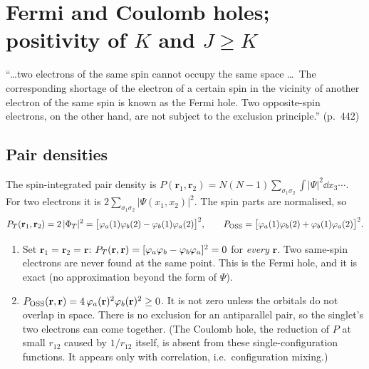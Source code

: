 \section{Fermi and Coulomb holes; positivity of $K$ and $J\ge K$}\label{sec:holes}

\begin{reviewclaim}
``\dots two electrons of the same spin cannot occupy the same space \dots\ The corresponding shortage
of the electron of a certain spin in the vicinity of another electron of the same spin is known as the
Fermi hole. Two opposite-spin electrons, on the other hand, are not subject to the exclusion principle.'' (p.~442)
\end{reviewclaim}

\subsection{Pair densities}
The spin-integrated pair density is $P(\mathbf r_1,\mathbf r_2)=N(N-1)\sum_{\sigma_1\sigma_2}\int|\Psi|^2\dd x_3\cdots$.
For two electrons it is $2\sum_{\sigma_1\sigma_2}|\Psi(x_1,x_2)|^2$. The spin parts are normalised, so
\begin{equation}
  P_T(\mathbf r_1,\mathbf r_2)=2\,|\Phi_T|^2=\bigl[\varphi_a(1)\varphi_b(2)-\varphi_b(1)\varphi_a(2)\bigr]^2,\qquad
  P_{\text{OSS}}=\bigl[\varphi_a(1)\varphi_b(2)+\varphi_b(1)\varphi_a(2)\bigr]^2 .
\end{equation}
\begin{enumerate}
  \item Set $\mathbf r_1=\mathbf r_2=\mathbf r$: $P_T(\mathbf r,\mathbf r)=[\varphi_a\varphi_b-\varphi_b\varphi_a]^2=0$ for \emph{every}
        $\mathbf r$. Two same-spin electrons are never found at the same point. This is the Fermi hole,
        and it is exact (no approximation beyond the form of $\Psi$).
  \item $P_{\text{OSS}}(\mathbf r,\mathbf r)=4\,\varphi_a(\mathbf r)^2\varphi_b(\mathbf r)^2\ge0$. It is not zero
        unless the orbitals do not overlap in space. There is no exclusion for an antiparallel pair,
        so the singlet's two electrons can come together. (The Coulomb hole, the reduction of $P$ at
        small $r_{12}$ caused by $1/r_{12}$ itself, is absent from these single-configuration functions.
        It appears only with correlation, i.e.\ configuration mixing.)
\end{enumerate}

